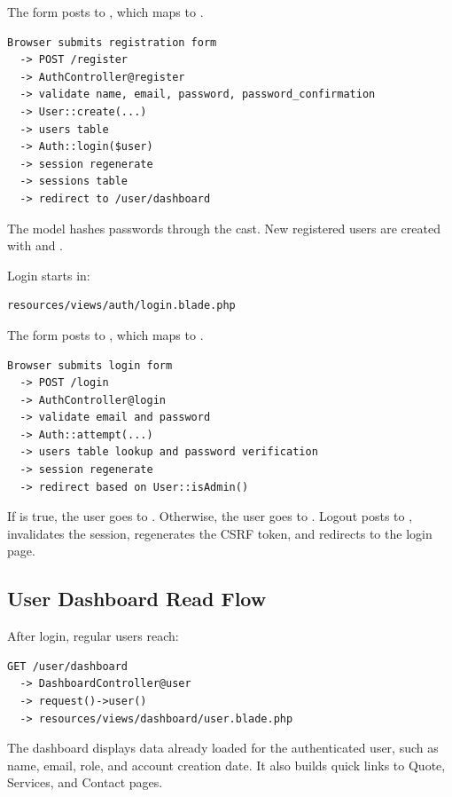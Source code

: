 \documentclass[11pt,a4paper]{article}
\begin{document}
The form posts to , which maps to .

\begin{verbatim}
Browser submits registration form
  -> POST /register
  -> AuthController@register
  -> validate name, email, password, password_confirmation
  -> User::create(...)
  -> users table
  -> Auth::login($user)
  -> session regenerate
  -> sessions table
  -> redirect to /user/dashboard
\end{verbatim}

The  model hashes passwords through the  cast. New registered users are created with  and .

Login starts in:

\begin{verbatim}
resources/views/auth/login.blade.php
\end{verbatim}

The form posts to , which maps to .

\begin{verbatim}
Browser submits login form
  -> POST /login
  -> AuthController@login
  -> validate email and password
  -> Auth::attempt(...)
  -> users table lookup and password verification
  -> session regenerate
  -> redirect based on User::isAdmin()
\end{verbatim}

If  is true, the user goes to . Otherwise, the user goes to . Logout posts to , invalidates the session, regenerates the CSRF token, and redirects to the login page.

\subsection{User Dashboard Read Flow}

After login, regular users reach:

\begin{verbatim}
GET /user/dashboard
  -> DashboardController@user
  -> request()->user()
  -> resources/views/dashboard/user.blade.php
\end{verbatim}

The dashboard displays data already loaded for the authenticated user, such as name, email, role, and account creation date. It also builds quick links to Quote, Services, and Contact pages.
\end{document}
